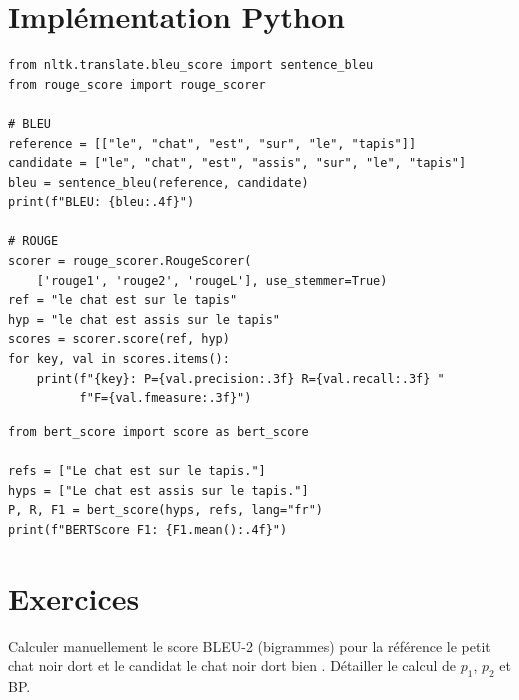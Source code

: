 \section{Impl\'ementation Python}
\label{sec:eval:code}

\begin{codeblock}[title=\textbf{Calcul de BLEU et ROUGE}]
\begin{verbatim}
from nltk.translate.bleu_score import sentence_bleu
from rouge_score import rouge_scorer

# BLEU
reference = [["le", "chat", "est", "sur", "le", "tapis"]]
candidate = ["le", "chat", "est", "assis", "sur", "le", "tapis"]
bleu = sentence_bleu(reference, candidate)
print(f"BLEU: {bleu:.4f}")

# ROUGE
scorer = rouge_scorer.RougeScorer(
    ['rouge1', 'rouge2', 'rougeL'], use_stemmer=True)
ref = "le chat est sur le tapis"
hyp = "le chat est assis sur le tapis"
scores = scorer.score(ref, hyp)
for key, val in scores.items():
    print(f"{key}: P={val.precision:.3f} R={val.recall:.3f} "
          f"F={val.fmeasure:.3f}")
\end{verbatim}
\end{codeblock}

\begin{codeblock}[title=\textbf{BERTScore}]
\begin{verbatim}
from bert_score import score as bert_score

refs = ["Le chat est sur le tapis."]
hyps = ["Le chat est assis sur le tapis."]
P, R, F1 = bert_score(hyps, refs, lang="fr")
print(f"BERTScore F1: {F1.mean():.4f}")
\end{verbatim}
\end{codeblock}

\section{Exercices}
\label{sec:eval:exercices}

\begin{exercice}
Calculer manuellement le score BLEU-2 (bigrammes) pour la r\'ef\'erence
\og le petit chat noir dort \fg et le candidat \og le chat noir dort
bien \fg. D\'etailler le calcul de $p_1$, $p_2$ et BP.
\end{exercice}

